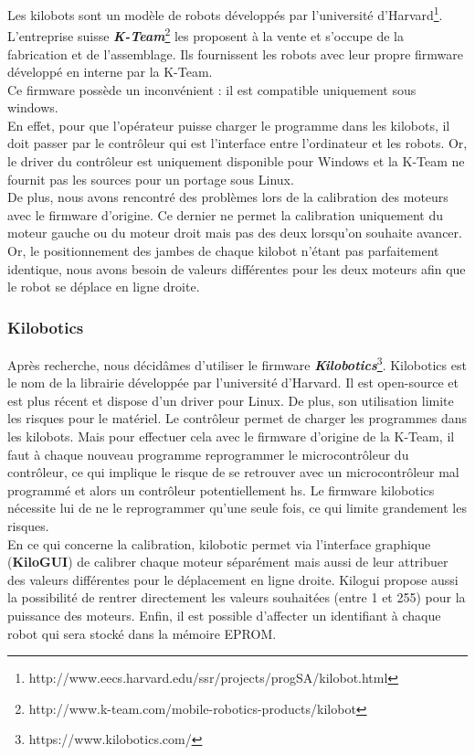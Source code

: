 \documentclass[a4paper,8pt]{report}
\begin{document}
Les kilobots sont un mod\`ele de robots d\'evelopp\'es par l'universit\'e d'Harvard\footnote{http://www.eecs.harvard.edu/ssr/projects/progSA/kilobot.html}. L'entreprise suisse \textit{\textbf{K-Team}}\footnote{http://www.k-team.com/mobile-robotics-products/kilobot} les proposent \`a la vente et s'occupe de la fabrication et de l'assemblage. Ils fournissent les robots avec leur propre firmware d\'evelopp\'e en interne par la K-Team. \\
Ce firmware poss\`ede un inconv\'enient : il est compatible uniquement sous windows. \\
En effet, pour que l'op\'erateur puisse charger le programme dans les kilobots, il doit passer par le contr\^oleur qui est l'interface entre l'ordinateur et les robots. Or, le driver du contr\^oleur est uniquement disponible pour Windows et la K-Team ne fournit pas les sources pour un portage sous Linux. \\
De plus, nous avons rencontr\'e des probl\`emes lors de la calibration des moteurs avec le firmware d'origine. Ce dernier ne permet la calibration uniquement du moteur gauche ou du moteur droit mais pas des deux lorsqu'on souhaite avancer. Or, le positionnement des jambes de chaque kilobot n'\'etant pas parfaitement identique, nous avons besoin de valeurs diff\'erentes pour les deux moteurs afin que le robot se d\'eplace en ligne droite.\\

\subsubsection*{Kilobotics}\label{subsubsec:name}

Apr\`es recherche, nous d\'ecid\^ames d'utiliser le firmware \textit{\textbf{Kilobotics}}\footnote{https://www.kilobotics.com/}. Kilobotics est le nom de la librairie d\'evelopp\'ee par l'universit\'e d'Harvard. Il est open-source et est plus r\'ecent et dispose d'un driver pour Linux. De plus, son utilisation limite les risques pour le mat\'eriel. Le contr\^oleur permet de charger les programmes dans les kilobots. Mais pour effectuer cela avec le firmware d'origine de la K-Team, il faut \`a chaque nouveau programme reprogrammer le microcontr\^oleur du contr\^oleur, ce qui implique le risque de se retrouver avec un microcontr\^oleur mal programm\'e et alors un contr\^oleur potentiellement hs. Le firmware kilobotics n\'ecessite lui de ne le reprogrammer qu'une seule fois, ce qui limite grandement les risques. \\
En ce qui concerne la calibration, kilobotic permet via l'interface graphique (\textbf{KiloGUI}) de calibrer chaque moteur s\'epar\'ement mais aussi de leur attribuer des valeurs diff\'erentes pour le d\'eplacement en ligne droite. Kilogui propose aussi la possibilit\'e de rentrer directement les valeurs souhait\'ees (entre 1 et 255) pour la puissance des moteurs. Enfin, il est possible d'affecter un identifiant \`a chaque robot qui sera stock\'e dans la m\'emoire EPROM.\\
\end{document}
